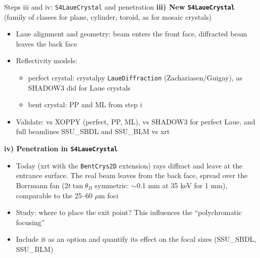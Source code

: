 \documentclass[aspectratio=169,10pt]{beamer}
\begin{document}
\begin{frame}{Steps iii and iv: \texttt{S4LaueCrystal} and penetration}
  \small
  \textbf{iii) New \texttt{S4LaueCrystal}} (family of classes for plane, cylinder, toroid, as for mosaic crystals)
  \begin{itemize}
    \item Laue alignment and geometry: beam enters the front face, diffracted beam leaves the back face
    \item Reflectivity models:
      \begin{itemize}
        \item perfect crystal: crystalpy \texttt{LaueDiffraction} (Zachariasen/Guigay), as SHADOW3
          did for Laue crystals
        \item bent crystal: PP and ML from step i
      \end{itemize}
    \item Validate: vs XOPPY (perfect, PP, ML), vs SHADOW3 for perfect Laue, and full beamlines
      SSU\_SBDL and SSU\_BLM vs xrt
  \end{itemize}

  \textbf{iv) Penetration in \texttt{S4LaueCrystal}}
  \begin{itemize}
    \item Today (xrt with the \texttt{BentCrys2D} extension) rays diffract and leave at the entrance surface. The real beam
      leaves from the back face, spread over the Borrmann fan ($2t\tan\theta_B$ symmetric: $\sim$0.1 mm
      at 35 keV for 1 mm), comparable to the 25--60 $\mu$m foci
    \item Study: where to place the exit point? This influences the ``polychromatic focusing''
    \item Include it as an option and quantify its effect on the focal sizes (SSU\_SBDL, SSU\_BLM)
  \end{itemize}
\end{frame}
\end{document}
